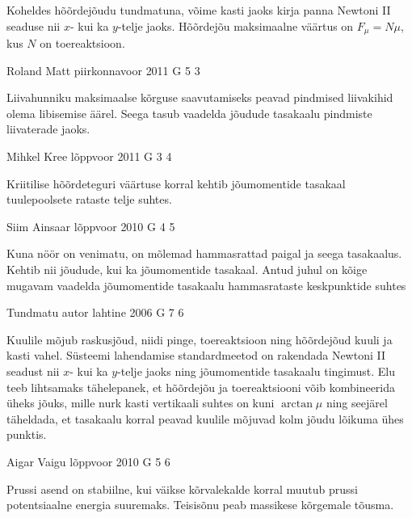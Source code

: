 \documentclass[11pt, twoside]{article}
\begin{document}
{{\ifHint
Koheldes hõõrdejõudu tundmatuna, võime kasti jaoks kirja panna Newtoni II seaduse nii $x$- kui ka $y$-telje jaoks. Hõõrdejõu maksimaalne väärtus on $F_\mu = N\mu$, kus $N$ on toereaktsioon.
\fi
}

{Roland Matt} %
{piirkonnavoor} %
{2011} %
{G 5} %
{3} %
{

\ifHint
Liivahunniku maksimaalse kõrguse saavutamiseks peavad pindmised liivakihid
olema libisemise äärel. Seega tasub vaadelda jõudude tasakaalu pindmiste liivaterade jaoks.
\fi
}

{Mihkel Kree} %
{lõppvoor} %
{2011} %
{G 3} %
{4} %
{

\ifHint
Kriitilise hõõrdeteguri väärtuse korral kehtib jõumomentide tasakaal tuulepoolsete rataste telje suhtes.
\fi
}

{Siim Ainsaar} %
{lõppvoor} %
{2010} %
{G 4} %
{5} %
{

\ifHint
Kuna nöör on venimatu, on mõlemad hammasrattad paigal ja seega tasakaalus. Kehtib nii jõudude, kui ka jõumomentide tasakaal. Antud juhul on kõige mugavam vaadelda jõumomentide tasakaalu hammasrataste keskpunktide suhtes
\fi
}

{Tundmatu autor} %
{lahtine} %
{2006} %
{G 7} %
{6} %
{

\ifHint
Kuulile mõjub raskusjõud, niidi pinge, toereaktsioon ning hõõrdejõud kuuli ja kasti vahel. Süsteemi lahendamise standardmeetod on rakendada Newtoni II seadust nii $x$- kui ka $y$-telje jaoks ning jõumomentide tasakaalu tingimust. Elu teeb lihtsamaks tähelepanek, et hõõrdejõu ja toereaktsiooni võib kombineerida üheks jõuks, mille nurk kasti vertikaali suhtes on kuni $\arctan\mu$ ning seejärel täheldada, et tasakaalu korral peavad kuulile mõjuvad kolm jõudu lõikuma ühes punktis.
\fi
}

{Aigar Vaigu} %
{lõppvoor} %
{2010} %
{G 5} %
{6} %
{

\ifHint
Prussi asend on stabiilne, kui väikse kõrvalekalde korral muutub prussi potentsiaalne energia suuremaks. Teisisõnu peab massikese kõrgemale tõusma.
\fi
}

}
\end{document}
